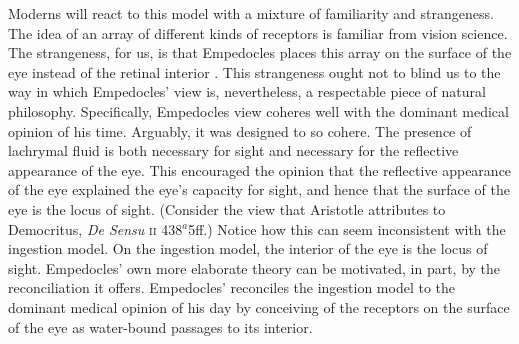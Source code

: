 Moderns will react to this model with a mixture of familiarity and strangeness. The idea of an array of different kinds of receptors is familiar from vision science. The strangeness, for us, is that Empedocles places this array on the surface of the eye instead of the retinal interior \citep[for a comparison of Empedocles' theory with modern theories of vision see][]{Siegel:1959fk}. This strangeness ought not to blind us to the way in which Empedocles' view is, nevertheless, a respectable piece of natural philosophy. Specifically, Empedocles view coheres well with the dominant medical opinion of his time. Arguably, it was designed to so cohere. The presence of lachrymal fluid is both necessary for sight and necessary for the reflective appearance of the eye. This encouraged the opinion that the reflective appearance of the eye explained the eye's capacity for sight, and hence that the surface of the eye is the locus of sight. (Consider the view that Aristotle attributes to Democritus, \emph{De Sensu} \textsc{ii} 438\( ^{a} \)5ff.) Notice how this can seem inconsistent with the ingestion model. On the ingestion model, the interior of the eye is the locus of sight. Empedocles' own more elaborate theory can be motivated, in part, by the reconciliation it offers. Empedocles' reconciles the ingestion model to the dominant medical opinion of his day by conceiving of the receptors on the surface of the eye as water-bound passages to its interior.

